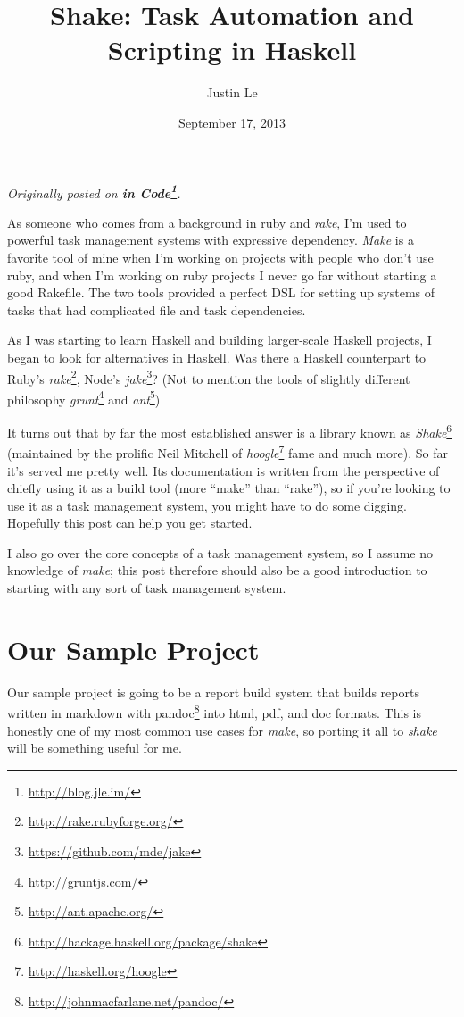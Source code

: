 \documentclass[]{article}
\title{Shake: Task Automation and Scripting in Haskell}
\author{Justin Le}
\date{September 17, 2013}
\renewcommand{\href}[2]{#2\footnote{\url{#1}}}
\begin{document}
\maketitle

\emph{Originally posted on \textbf{\href{http://blog.jle.im/}{in
Code}}.}

As someone who comes from a background in ruby and \emph{rake}, I'm used
to powerful task management systems with expressive dependency.
\emph{Make} is a favorite tool of mine when I'm working on projects with
people who don't use ruby, and when I'm working on ruby projects I never
go far without starting a good Rakefile. The two tools provided a
perfect DSL for setting up systems of tasks that had complicated file
and task dependencies.

As I was starting to learn Haskell and building larger-scale Haskell
projects, I began to look for alternatives in Haskell. Was there a
Haskell counterpart to Ruby's
\href{http://rake.rubyforge.org/}{\emph{rake}}, Node's
\href{https://github.com/mde/jake}{\emph{jake}}? (Not to mention the
tools of slightly different philosophy
\href{http://gruntjs.com/}{\emph{grunt}} and
\href{http://ant.apache.org/}{\emph{ant}})

It turns out that by far the most established answer is a library known
as \href{http://hackage.haskell.org/package/shake}{\emph{Shake}}
(maintained by the prolific Neil Mitchell of
\href{http://haskell.org/hoogle}{\emph{hoogle}} fame and much more). So
far it's served me pretty well. Its documentation is written from the
perspective of chiefly using it as a build tool (more ``make'' than
``rake''), so if you're looking to use it as a task management system,
you might have to do some digging. Hopefully this post can help you get
started.

I also go over the core concepts of a task management system, so I
assume no knowledge of \emph{make}; this post therefore should also be a
good introduction to starting with any sort of task management system.

\section{Our Sample Project}\label{our-sample-project}

Our sample project is going to be a report build system that builds
reports written in markdown with
\href{http://johnmacfarlane.net/pandoc/}{pandoc} into html, pdf, and doc
formats. This is honestly one of my most common use cases for
\emph{make}, so porting it all to \emph{shake} will be something useful
for me.
\end{document}
